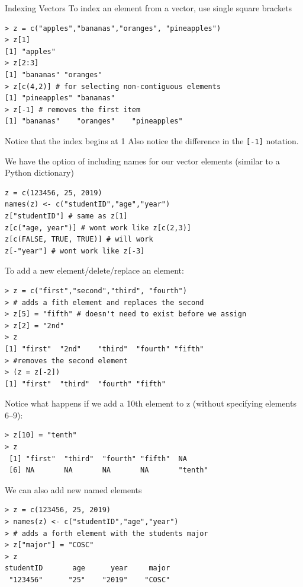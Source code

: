 \documentclass[xcolor=svgnames, 10pt]{beamer}
\begin{document}
\begin{frame}[fragile]{Indexing Vectors}
To index an element from a vector, use single square brackets
\begin{Verbatim}[xleftmargin=0.3in]
> z = c("apples","bananas","oranges", "pineapples")
> z[1]
[1] "apples"
> z[2:3]
[1] "bananas" "oranges"
> z[c(4,2)] # for selecting non-contiguous elements
[1] "pineapples" "bananas"   
> z[-1] # removes the first item
[1] "bananas"    "oranges"    "pineapples"
\end{Verbatim}
\begin{alertblock}{Notice that the index begins at 1}
Also notice the difference in the \verb|[-1]| notation.
\end{alertblock}

\end{frame}


\begin{frame}[fragile]{}
We have the option of including names for our vector elements (similar to a Python dictionary)
\begin{Verbatim}[xleftmargin=0.3in]
z = c(123456, 25, 2019)
names(z) <- c("studentID","age","year")
z["studentID"] # same as z[1]
z[c("age, year")] # wont work like z[c(2,3)]
z[c(FALSE, TRUE, TRUE)] # will work 
z[-"year"] # wont work like z[-3]
\end{Verbatim}
\end{frame}


\begin{frame}[fragile]{}
To add a new element/delete/replace an element:
\begin{Verbatim}[xleftmargin=0.4in]
> z = c("first","second","third", "fourth")
> # adds a fith element and replaces the second
> z[5] = "fifth" # doesn't need to exist before we assign
> z[2] = "2nd"
> z
[1] "first"  "2nd"    "third"  "fourth" "fifth" 
> #removes the second element
> (z = z[-2])
[1] "first"  "third"  "fourth" "fifth" 
\end{Verbatim}


\end{frame}


\begin{frame}[fragile]{}
Notice what happens if we add a 10th element to z (without specifying elements 6--9):
\begin{Verbatim}[xleftmargin=0.4in]
> z[10] = "tenth"
> z
 [1] "first"  "third"  "fourth" "fifth"  NA      
 [6] NA       NA       NA       NA       "tenth" 
 \end{Verbatim}
We can also add new named elements
\begin{Verbatim}[xleftmargin=0.4in]
> z = c(123456, 25, 2019)
> names(z) <- c("studentID","age","year")
> # adds a forth element with the students major
> z["major"] = "COSC"
> z
studentID       age      year     major 
 "123456"      "25"    "2019"    "COSC" 
 \end{Verbatim}
\end{frame}
\end{document}
